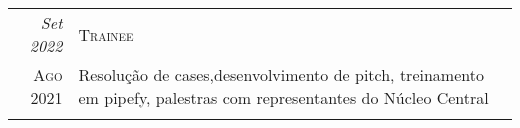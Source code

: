 \begin{framed}
\begin{tabular}{r|p{15cm}}
\emph{Set 2022}   & \textsc{Trainee} \\
\textsc{Ago 2021} & \footnotesize{Resolução de cases,desenvolvimento de pitch, treinamento em pipefy, palestras com representantes do Núcleo Central}\\
\multicolumn{2}{c}{} \\
\end{tabular}

\end{framed}
